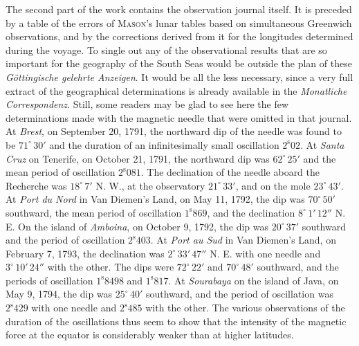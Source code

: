 The second part of the work contains the observation journal itself. It is preceded by a table of the errors of \textsc{Mason}'s lunar tables based on simultaneous Greenwich observations, and by the corrections derived from it for the longitudes determined during the voyage. To single out any of the observational results that are so important for the geography of the South Seas would be outside the plan of these \emph{Göttingische gelehrte Anzeigen}. It would be all the less necessary, since a very full extract of the geographical determinations is already available in the \emph{Monatliche Correspondenz}. Still, some readers may be glad to see here the few determinations made with the magnetic needle that were omitted in that journal. At \emph{Brest}, on September 20, 1791, the northward dip of the needle was found to be $71^\circ\,30'$ and the duration of an infinitesimally small oscillation $2^{\mathrm s}02$. At \emph{Santa Cruz} on Tenerife, on October 21, 1791, the northward dip was $62^\circ\,25'$ and the mean period of oscillation $2^{\mathrm s}081$. The declination of the needle aboard the Recherche was $18^\circ\,7'$ N. W., at the observatory $21^\circ\,33'$, and on the mole $23^\circ\,43'$. At \emph{Port du Nord} in Van Diemen's Land, on May 11, 1792, the dip was $70^\circ\,50'$ southward, the mean period of oscillation $1^{\mathrm s}869$, and the declination $8^\circ\,1'\,12''$ N. E. On the island of \emph{Amboina}, on October 9, 1792, the dip was $20^\circ\,37'$ southward and the period of oscillation $2^{\mathrm s}403$. At \emph{Port au Sud} in Van Diemen's Land, on February 7, 1793, the declination was $2^\circ\,33'\,47''$ N. E. with one needle and $3^\circ\,10'\,24''$ with the other. The dips were $72^\circ\,22'$ and $70^\circ\,48'$ southward, and the periods of oscillation $1^{\mathrm s}8498$ and $1^{\mathrm s}817$. At \emph{Sourabaya} on the island of Java, on May 9, 1794, the dip was $25^\circ\,40'$ southward, and the period of oscillation was $2^{\mathrm s}429$ with one needle and $2^{\mathrm s}485$ with the other. The various observations of the duration of the oscillations thus seem to show that the intensity of the magnetic force at the equator is considerably weaker than at higher latitudes.
